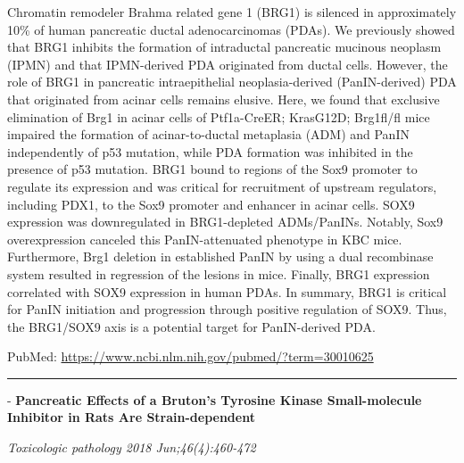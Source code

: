 \documentclass[]{article}
\begin{document}
Chromatin remodeler Brahma related gene 1 (BRG1) is silenced in
approximately 10\% of human pancreatic ductal adenocarcinomas (PDAs). We
previously showed that BRG1 inhibits the formation of intraductal
pancreatic mucinous neoplasm (IPMN) and that IPMN-derived PDA originated
from ductal cells. However, the role of BRG1 in pancreatic
intraepithelial neoplasia-derived (PanIN-derived) PDA that originated
from acinar cells remains elusive. Here, we found that exclusive
elimination of Brg1 in acinar cells of Ptf1a-CreER; KrasG12D; Brg1fl/fl
mice impaired the formation of acinar-to-ductal metaplasia (ADM) and
PanIN independently of p53 mutation, while PDA formation was inhibited
in the presence of p53 mutation. BRG1 bound to regions of the Sox9
promoter to regulate its expression and was critical for recruitment of
upstream regulators, including PDX1, to the Sox9 promoter and enhancer
in acinar cells. SOX9 expression was downregulated in BRG1-depleted
ADMs/PanINs. Notably, Sox9 overexpression canceled this PanIN-attenuated
phenotype in KBC mice. Furthermore, Brg1 deletion in established PanIN
by using a dual recombinase system resulted in regression of the lesions
in mice. Finally, BRG1 expression correlated with SOX9 expression in
human PDAs. In summary, BRG1 is critical for PanIN initiation and
progression through positive regulation of SOX9. Thus, the BRG1/SOX9
axis is a potential target for PanIN-derived PDA.

PubMed: \url{https://www.ncbi.nlm.nih.gov/pubmed/?term=30010625}

{}

{}

\begin{center}\rule{0.5\linewidth}{\linethickness}\end{center}

 - \textbf{Pancreatic Effects of a Bruton's Tyrosine Kinase
Small-molecule Inhibitor in Rats Are Strain-dependent}

\emph{Toxicologic pathology 2018 Jun;46(4):460-472}
\end{document}
